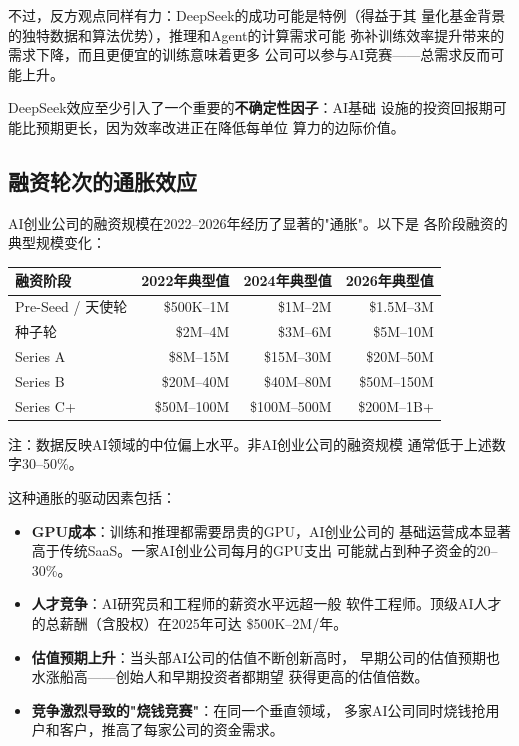 不过，反方观点同样有力：DeepSeek的成功可能是特例（得益于其
量化基金背景的独特数据和算法优势），推理和Agent的计算需求可能
弥补训练效率提升带来的需求下降，而且更便宜的训练意味着更多
公司可以参与AI竞赛——总需求反而可能上升。

DeepSeek效应至少引入了一个重要的\textbf{不确定性因子}：AI基础
设施的投资回报期可能比预期更长，因为效率改进正在降低每单位
算力的边际价值。

\subsection{融资轮次的通胀效应}
\label{subsec:fund-inflation}

AI创业公司的融资规模在2022--2026年经历了显著的"通胀"。以下是
各阶段融资的典型规模变化：

\begin{keybox}[AI创业公司各阶段融资规模演变]
\small
\begin{tabularx}{\textwidth}{l r r r}
\toprule
\rowcolor{figLightGray}
\textbf{融资阶段} & \textbf{2022年典型值}
  & \textbf{2024年典型值} & \textbf{2026年典型值} \\
\midrule
Pre-Seed / 天使轮  & \$500K--1M   & \$1M--2M    & \$1.5M--3M \\
种子轮              & \$2M--4M    & \$3M--6M    & \$5M--10M \\
Series A            & \$8M--15M   & \$15M--30M  & \$20M--50M \\
Series B            & \$20M--40M  & \$40M--80M  & \$50M--150M \\
Series C+           & \$50M--100M & \$100M--500M & \$200M--1B+ \\
\bottomrule
\end{tabularx}

\medskip
\noindent 注：数据反映AI领域的中位偏上水平。非AI创业公司的融资规模
通常低于上述数字30--50\%。
\end{keybox}

这种通胀的驱动因素包括：
\begin{itemize}
  \item \textbf{GPU成本}：训练和推理都需要昂贵的GPU，AI创业公司的
    基础运营成本显著高于传统SaaS。一家AI创业公司每月的GPU支出
    可能就占到种子资金的20--30\%。
  \item \textbf{人才竞争}：AI研究员和工程师的薪资水平远超一般
    软件工程师。顶级AI人才的总薪酬（含股权）在2025年可达
    \$500K--2M/年。
  \item \textbf{估值预期上升}：当头部AI公司的估值不断创新高时，
    早期公司的估值预期也水涨船高——创始人和早期投资者都期望
    获得更高的估值倍数。
  \item \textbf{竞争激烈导致的"烧钱竞赛"}：在同一个垂直领域，
    多家AI公司同时烧钱抢用户和客户，推高了每家公司的资金需求。
\end{itemize}

